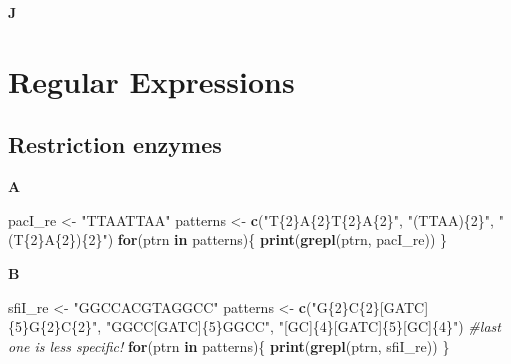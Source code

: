 \documentclass[]{book}
\newenvironment{Shaded}{\begin{snugshade}}{\end{snugshade}}
\newcommand{\CharTok}[1]{\textcolor[rgb]{0.31,0.60,0.02}{#1}}
\newcommand{\CommentTok}[1]{\textcolor[rgb]{0.56,0.35,0.01}{\textit{#1}}}
\newcommand{\ControlFlowTok}[1]{\textcolor[rgb]{0.13,0.29,0.53}{\textbf{#1}}}
\newcommand{\DecValTok}[1]{\textcolor[rgb]{0.00,0.00,0.81}{#1}}
\newcommand{\KeywordTok}[1]{\textcolor[rgb]{0.13,0.29,0.53}{\textbf{#1}}}
\newcommand{\NormalTok}[1]{#1}
\newcommand{\OperatorTok}[1]{\textcolor[rgb]{0.81,0.36,0.00}{\textbf{#1}}}
\newcommand{\StringTok}[1]{\textcolor[rgb]{0.31,0.60,0.02}{#1}}
\begin{document}
\textbf{J}

\begin{Shaded}
\end{Shaded}

\hypertarget{regular-expressions-1}{%
\section{Regular Expressions}\label{regular-expressions-1}}

\hypertarget{restriction-enzymes-2}{%
\subsection{Restriction enzymes}\label{restriction-enzymes-2}}

\textbf{A}

\begin{Shaded}
\begin{Highlighting}[]
\NormalTok{pacI_re <-}\StringTok{ "TTAATTAA"}
\NormalTok{patterns <-}\StringTok{ }\KeywordTok{c}\NormalTok{(}\StringTok{"T\{2\}A\{2\}T\{2\}A\{2\}"}\NormalTok{,}
           \StringTok{"(TTAA)\{2\}"}\NormalTok{, }
           \StringTok{"(T\{2\}A\{2\})\{2\}"}\NormalTok{)}
\ControlFlowTok{for}\NormalTok{(ptrn }\ControlFlowTok{in}\NormalTok{ patterns)\{}
    \KeywordTok{print}\NormalTok{(}\KeywordTok{grepl}\NormalTok{(ptrn, pacI_re))}
\NormalTok{\}}
\end{Highlighting}
\end{Shaded}

\textbf{B}

\begin{Shaded}
\begin{Highlighting}[]
\NormalTok{sfiI_re <-}\StringTok{ "GGCCACGTAGGCC"}
\NormalTok{patterns <-}\StringTok{ }\KeywordTok{c}\NormalTok{(}\StringTok{"G\{2\}C\{2\}[GATC]\{5\}G\{2\}C\{2\}"}\NormalTok{,}
           \StringTok{"GGCC[GATC]\{5\}GGCC"}\NormalTok{, }
           \StringTok{"[GC]\{4\}[GATC]\{5\}[GC]\{4\}"}\NormalTok{) }\CommentTok{#last one is less specific!}
\ControlFlowTok{for}\NormalTok{(ptrn }\ControlFlowTok{in}\NormalTok{ patterns)\{}
    \KeywordTok{print}\NormalTok{(}\KeywordTok{grepl}\NormalTok{(ptrn, sfiI_re))}
\NormalTok{\}}
\end{Highlighting}
\end{Shaded}
\end{document}

